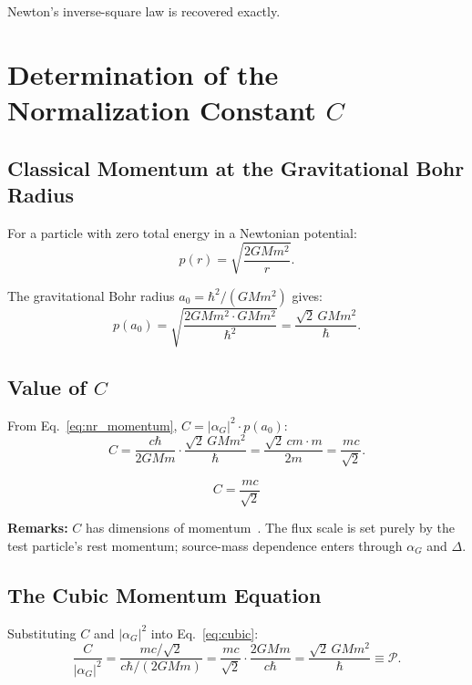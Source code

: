 \documentclass[11pt,a4paper]{article}
\theoremstyle{definition}
\theoremstyle{remark}
\begin{document}
	Newton's inverse-square law is recovered exactly.
	
	\section{Determination of the Normalization Constant $C$}
	
	\subsection{Classical Momentum at the Gravitational Bohr Radius}
	
	For a particle with zero total energy in a Newtonian potential:
	\begin{equation}
		p(r) = \sqrt{\frac{2GMm^2}{r}}.
	\end{equation}
	
	The gravitational Bohr radius $a_0 = \hbar^2/(GMm^2)$ gives:
	\begin{equation}
		p(a_0) = \sqrt{\frac{2GMm^2\cdot GMm^2}{\hbar^2}} = \frac{\sqrt{2}\,GMm^2}{\hbar}.
	\end{equation}
	
	\subsection{Value of $C$}
	
	From Eq.~\eqref{eq:nr_momentum}, $C = |\alpha_G|^2\cdot p(a_0)$:
	\begin{equation}
		C = \frac{c\hbar}{2GMm}\cdot\frac{\sqrt{2}\,GMm^2}{\hbar} = \frac{\sqrt{2}\,cm\cdot m}{2m} = \frac{mc}{\sqrt{2}}.
	\end{equation}
	
	\begin{equation}
		\boxed{C = \frac{mc}{\sqrt{2}}}
		\label{eq:C_final}
	\end{equation}
	
	\textbf{Remarks:}  $C$ has dimensions of momentum~\checkmark.  The flux scale is set purely by the test particle's rest momentum; source-mass dependence enters through $\alpha_G$ and $\Delta$.
	
	\subsection{The Cubic Momentum Equation}
	
	Substituting $C$ and $|\alpha_G|^2$ into Eq.~\eqref{eq:cubic}:
	\begin{equation}
		\frac{C}{|\alpha_G|^2} = \frac{mc/\sqrt{2}}{c\hbar/(2GMm)} = \frac{mc}{\sqrt{2}}\cdot\frac{2GMm}{c\hbar} = \frac{\sqrt{2}\,GMm^2}{\hbar} \equiv \mathcal{P}.
	\end{equation}
	
\end{document}
